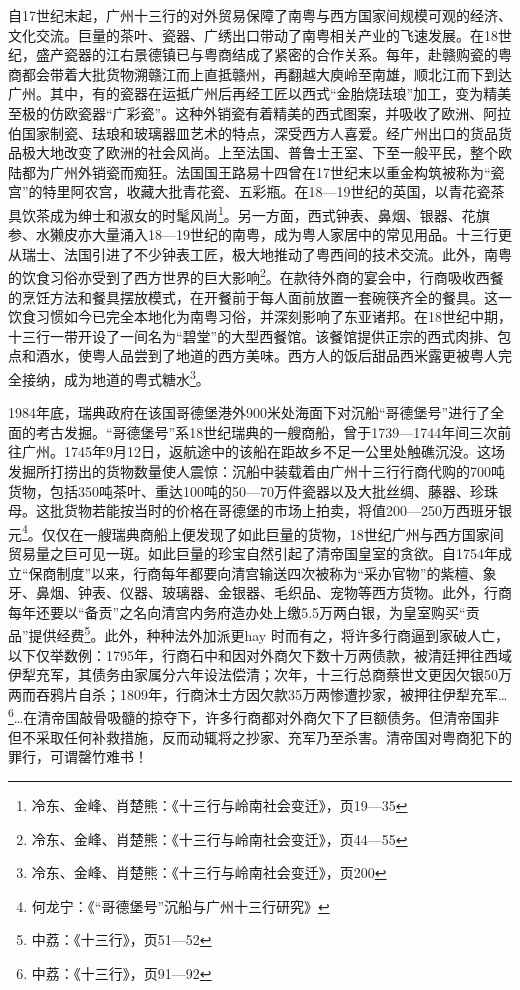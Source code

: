自17世纪末起，广州十三行的对外贸易保障了南粤与西方国家间规模可观的经济、文化交流。巨量的茶叶、瓷器、广绣出口带动了南粤相关产业的飞速发展。在18世纪，盛产瓷器的江右景德镇已与粤商结成了紧密的合作关系。每年，赴赣购瓷的粤商都会带着大批货物溯赣江而上直抵赣州，再翻越大庾岭至南雄，顺北江而下到达广州。其中，有的瓷器在运抵广州后再经工匠以西式“金胎烧珐琅”加工，变为精美至极的仿欧瓷器“广彩瓷”。这种外销瓷有着精美的西式图案，并吸收了欧洲、阿拉伯国家制瓷、珐琅和玻璃器皿艺术的特点，深受西方人喜爱。经广州出口的货品货品极大地改变了欧洲的社会风尚。上至法国、普鲁士王室、下至一般平民，整个欧陆都为广州外销瓷而痴狂。法国国王路易十四曾在17世纪末以重金构筑被称为“瓷宫”的特里阿农宫，收藏大批青花瓷、五彩瓶。在18—19世纪的英国，以青花瓷茶具饮茶成为绅士和淑女的时髦风尚\footnote{冷东、金峰、肖楚熊：《十三行与岭南社会变迁》，页19—35}。另一方面，西式钟表、鼻烟、银器、花旗参、水獭皮亦大量涌入18—19世纪的南粤，成为粤人家居中的常见用品。十三行更从瑞士、法国引进了不少钟表工匠，极大地推动了粤西间的技术交流。此外，南粤的饮食习俗亦受到了西方世界的巨大影响\footnote{冷东、金峰、肖楚熊：《十三行与岭南社会变迁》，页44—55}。在款待外商的宴会中，行商吸收西餐的烹饪方法和餐具摆放模式，在开餐前于每人面前放置一套碗筷齐全的餐具。这一饮食习惯如今已完全本地化为南粤习俗，并深刻影响了东亚诸邦。在18世纪中期，十三行一带开设了一间名为“碧堂”的大型西餐馆。该餐馆提供正宗的西式肉排、包点和酒水，使粤人品尝到了地道的西方美味。西方人的饭后甜品西米露更被粤人完全接纳，成为地道的粤式糖水\footnote{冷东、金峰、肖楚熊：《十三行与岭南社会变迁》，页200}。

1984年底，瑞典政府在该国哥德堡港外900米处海面下对沉船“哥德堡号”进行了全面的考古发掘。“哥德堡号”系18世纪瑞典的一艘商船，曾于1739—1744年间三次前往广州。1745年9月12日，返航途中的该船在距故乡不足一公里处触礁沉没。这场发掘所打捞出的货物数量使人震惊：沉船中装载着由广州十三行行商代购的700吨货物，包括350吨茶叶、重达100吨的50—70万件瓷器以及大批丝绸、藤器、珍珠母。这批货物若能按当时的价格在哥德堡的市场上拍卖，将值200—250万西班牙银元\footnote{何龙宁：《“哥德堡号”沉船与广州十三行研究》}。仅仅在一艘瑞典商船上便发现了如此巨量的货物，18世纪广州与西方国家间贸易量之巨可见一斑。如此巨量的珍宝自然引起了清帝国皇室的贪欲。自1754年成立“保商制度”以来，行商每年都要向清宫输送四次被称为“采办官物”的紫檀、象牙、鼻烟、钟表、仪器、玻璃器、金银器、毛织品、宠物等西方货物。此外，行商每年还要以“备贡”之名向清宫内务府造办处上缴5.5万两白银，为皇室购买“贡品”提供经费\footnote{中荔：《十三行》，页51—52}。此外，种种法外加派更hay 时而有之，将许多行商逼到家破人亡，以下仅举数例：1795年，行商石中和因对外商欠下数十万两债款，被清廷押往西域伊犁充军，其债务由家属分六年设法偿清；次年，十三行总商蔡世文更因欠银50万两而吞鸦片自杀；1809年，行商沐士方因欠款35万两惨遭抄家，被押往伊犁充军…\footnote{中荔：《十三行》，页91—92}…在清帝国敲骨吸髓的掠夺下，许多行商都对外商欠下了巨额债务。但清帝国非但不采取任何补救措施，反而动辄将之抄家、充军乃至杀害。清帝国对粤商犯下的罪行，可谓罄竹难书！


